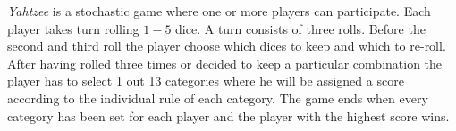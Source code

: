 \emph{Yahtzee} is a stochastic game where one or more players can participate. Each player takes turn rolling $1-5$ dice. A turn consists of three rolls. Before the second and third roll the player choose which dices to keep and which to re-roll. After having rolled three times or decided to keep a particular combination the player has to select 1 out 13 categories where he will be assigned a score according to the individual rule of each category. The game ends when every category has been set for each player and the player with the highest score wins.
